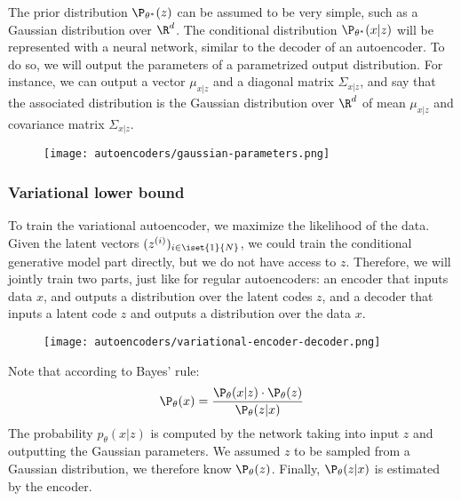 The prior distribution $\P_{\theta^*}(z)$ can be assumed to be very simple, such as a Gaussian distribution over $\R^d$. The conditional distribution $\P_{\theta^*}(x|z)$ will be represented with a neural network, similar to the decoder of an autoencoder. To do so, we will output the parameters of a parametrized output distribution. For instance, we can output a vector $\mu_{x|z}$ and a diagonal matrix $\Sigma_{x|z}$, and say that the associated distribution is the Gaussian distribution over $\R^d$ of mean $\mu_{x|z}$ and covariance matrix $\Sigma_{x|z}$.
\begin{figure}[H]
    \centering
    \texttt{[image: autoencoders/gaussian-parameters.png]}
\end{figure}

\subsubsection{Variational lower bound}
To train the variational autoencoder, we maximize the likelihood of the data. Given the latent vectors $(z^{(i)})_{i\in\iset{1}{N}}$, we could train the conditional generative model part directly, but we do not have access to $z$. Therefore, we will jointly train two parts, just like for regular autoencoders: an encoder that inputs data $x$, and outputs a distribution over the latent codes $z$, and a decoder that inputs a latent code $z$ and outputs a distribution over the data $x$.

\begin{figure}[H]
    \centering
    \texttt{[image: autoencoders/variational-encoder-decoder.png]}
\end{figure}

Note that according to Bayes' rule:
\begin{equation*}
    \P_\theta(x) = \frac{\P_\theta(x|z)\cdot \P_\theta(z)}{\P_\theta(z|x)}
\end{equation*}
The probability $p_\theta(x|z)$ is computed by the network taking into input $z$ and outputting the Gaussian parameters. We assumed $z$ to be sampled from a Gaussian distribution, we therefore know $\P_\theta(z)$. Finally, $\P_\theta(z|x)$ is estimated by the encoder.

